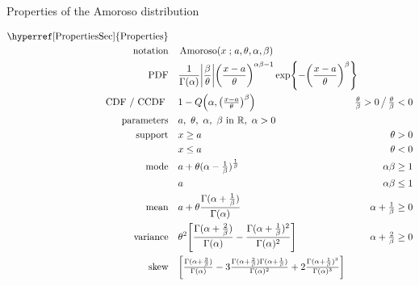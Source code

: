 

\begin{table*}[pt!]

\caption[Amoroso distribution -- Properties]{Properties of the Amoroso distribution}

\begin{align*}
\text{\hyperref[PropertiesSec]{Properties}}  \quad& \\
\text{notation} \quad &  \op{Amoroso}(x\given a, \theta, \alpha, \beta)  \checked
\\
\text{PDF} \quad &
\frac{1}{\Gamma(\alpha)} 
\Left|\frac{\beta}{\theta}\Right|
\Left(\frac{x-a}{\theta}\Right)^{\alpha \beta -1}
\exp \Left\{
-  \Left(\frac{x-a}{\theta}\Right)^{\beta}
\Right\}
\checked
\hspace{-8em}
\\ 
\text{CDF / CCDF } \quad  &    1-Q\Left(\alpha, \Left(\tfrac{x - a }{\theta}\Right)^{\beta}\Right) 
\checked & \tfrac{\theta}{\beta}>0 \, \big/ \,  \tfrac{\theta}{\beta}<0
\\
\text{parameters}\quad &   a,\ \theta,\ \alpha,\ \beta\  \text{in } \Real, \ \alpha>0	\checked
\\
\text{support} \quad &     x \geq a &  \theta > 0 \checked
\\
&   x\leq a  &  \theta < 0 	\checked
\\
\text{mode} \quad&   a+ \theta (\alpha-\tfrac{1}{\beta})^{\frac{1}{\beta}}  \checked
& \alpha \beta  \geq 1		\checked
\\ & a & \alpha \beta  \le 1
\\
\text{mean} \quad& a  + \theta \frac{\Gamma(\alpha+\frac{1}{\beta})}{\Gamma(\alpha)}  \checked
& \alpha + \tfrac{1}{\beta} \geq 0
\\
\text{variance}  \quad&   \theta^2 \Left[  \frac{\Gamma(\alpha+\frac{2}{\beta})}{\Gamma(\alpha)}  - 
\frac{\Gamma(\alpha+\frac{1}{\beta})^2}{\Gamma(\alpha)^2}    \Right] \checked
& \alpha + \tfrac{2}{\beta} \geq 0
\\
\text{skew} \quad  &  \Left[  \tfrac{\Gamma(\alpha+\frac{3}{\beta})}{\Gamma(\alpha)} - 3 \tfrac{\Gamma(\alpha+\frac{2}{\beta})\Gamma(\alpha+\frac{1}{\beta})}{\Gamma(\alpha)^2}    + 2  \tfrac{\Gamma(\alpha+\frac{1}{\beta})^3}{\Gamma(\alpha)^3}   \Right]

\end{align*}
\end{table*}
